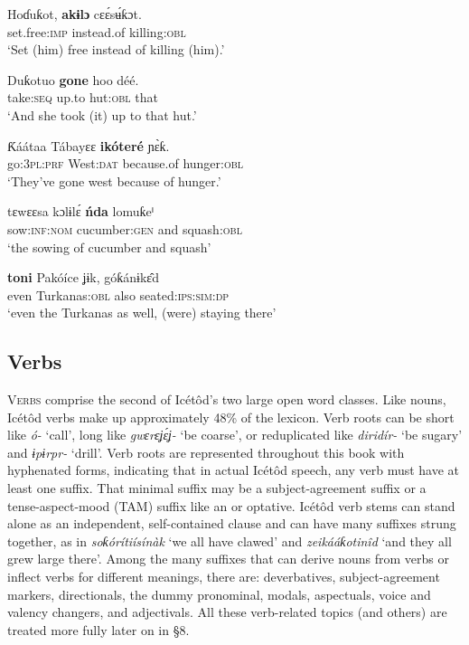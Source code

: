 \ea\label{ex:morph:4}
\gll Hoɗuƙot{\ᵉ},   \textbf{akɨlɔ}     cɛ\'{ɛ}s\'{ʉ}ƙɔt\ᶤ. \\
set.free:\textsc{imp}   instead.of   killing:\textsc{obl}    \\
\glt ‘Set (him) free instead of killing (him).’ 
\z




\ea\label{ex:morph:5}
\gll Duƙotuo   \textbf{gone}   hoo     déé. \\
take:\textsc{seq}   up.to   hut:\textsc{obl}   that    \\
\glt ‘And she took (it) up to that hut.’ 
\z




\ea\label{ex:morph:6}
\gll Ƙáátaa   Tábayɛɛ   \textbf{ikóteré}   ɲ\`{ɛ}ƙ{\ᵋ}. \\
go:\textsc{3pl:prf}   West:\textsc{dat}   because.of   hunger:\textsc{obl}    \\
\glt ‘They’ve gone west because of hunger.’ 
\z




\ea\label{ex:morph:7}
\gll tɛwɛɛsa     kɔlɨl{\Í}\'{ɛ}       \textbf{ńda}   lomuƙeⁱ \\
sow:\textsc{inf:nom}   cucumber:\textsc{gen}   and   squash:\textsc{obl}   \\
\glt ‘the sowing of cucumber and squash’ 
\z




\ea\label{ex:morph:8}
\gll \textbf{toni}   Pakóíce     ʝɨk,   góƙánɨk\^{ɛ}d{\ᵋ} \\
even  Turkanas:\textsc{obl}   also   seated:\textsc{ips:sim:dp}    \\
\glt ‘even the Turkanas as well, (were) staying there’ 
\z






\subsection{Verbs}\label{sec:3.8}


\textsc{Verbs} comprise the second of Icétôd’s two large open word classes. Like nouns, Icétôd verbs make up approximately 48\% of the lexicon. Verb roots can be short like \textit{ó-} ‘call’, long like \textit{gwɛrɛʝ\'{ɛ}ʝ-} ‘be coarse’, or reduplicated like \textit{diridír-} ‘be sugary’ and \textit{ɨpɨr{\Í}p{\Í}r-} ‘drill’. Verb roots are represented throughout this book with hyphenated forms, indicating that in actual Icétôd speech, any verb must have at least one suffix. That minimal suffix may be a subject-agreement suffix or a tense-aspect-mood (TAM) suffix like an  or optative. Icétôd verb stems can stand alone as an independent, self-contained clause and can have many suffixes strung together, as in \textit{soƙórítiísínàk\ᵃ} ‘we all have clawed’ and \textit{zeikááƙotinîd{\ᵉ}} ‘and they all grew large there’. Among the many suffixes that can derive nouns from verbs or inflect verbs for different meanings, there are: deverbatives, subject-agreement markers, directionals, the dummy pronominal, modals, aspectuals, voice and valency changers, and adjectivals. All these verb-related topics (and others) are treated more fully later on in §8.




